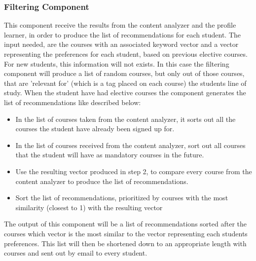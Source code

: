 \subsubsection{Filtering Component}
This component receive the results from the content analyzer and the profile learner, in order to produce the list of recommendations for each student. The input needed, are the courses with an associated keyword vector and a vector representing the preferences for each student, based on previous elective courses. For new students, this information will not exists. In this case the filtering component will produce a list of random courses, but only out of those courses, that are 'relevant for' (which is a tag placed on each course) the students line of study. When the student have had elective courses the component generates the list of recommendations like described below:
\begin{itemize}
	\item In the list of courses taken from the content analyzer, it sorts out all the courses the student have already been signed up for.
	\item In the list of courses received from the content analyzer, sort out all courses that the student will have as mandatory courses in the future.
	\item Use the resulting vector produced in step 2, to compare every course from the content analyzer to produce the list of recommendations.
	\item Sort the list of recommendations, prioritized by courses with the most similarity (closest to 1) with the resulting vector 
\end{itemize}
The output of this component will be a list of recommendations sorted after the courses which vector is the most similar to the vector representing each students preferences. This list will then be shortened down to an appropriate length with courses and sent out by email to every student. 



